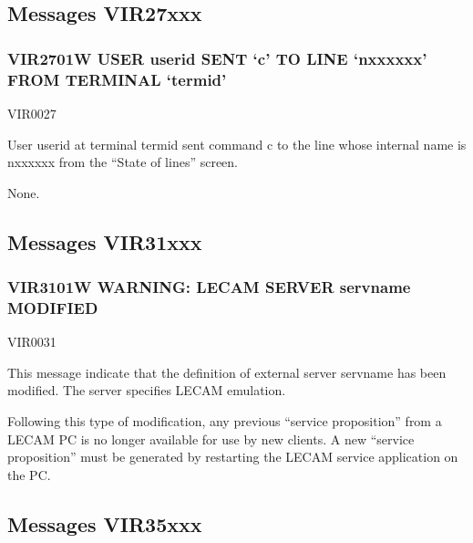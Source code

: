 \documentclass[letterpaper,10pt,english]{sphinxmanual}
\begin{document}
\subsection{Messages VIR27xxx}
\label{\detokenize{messages:messages-vir27xxx}}

\subsubsection{VIR2701W USER userid SENT ‘c’ TO LINE ‘n\sphinxhyphen{}xxxxxx’ FROM TERMINAL ‘termid’}
\label{\detokenize{messages:vir2701w-user-userid-sent-c-to-line-n-xxxxxx-from-terminal-termid}}\begin{description}
\sphinxAtStartPar
VIR0027

\sphinxAtStartPar
User userid at terminal termid sent command c to the line whose internal name is n\sphinxhyphen{}xxxxxx from the “State of lines” screen.

\sphinxAtStartPar
None.

\end{description}


\subsection{Messages VIR31xxx}
\label{\detokenize{messages:messages-vir31xxx}}

\subsubsection{VIR3101W WARNING: LECAM SERVER servname MODIFIED}
\label{\detokenize{messages:vir3101w-warning-lecam-server-servname-modified}}\begin{description}
\sphinxAtStartPar
VIR0031

\sphinxAtStartPar
This message indicate that the definition of external server servname has been modified. The server specifies LECAM emulation.

\sphinxAtStartPar
Following this type of modification, any previous “service proposition” from a LECAM PC is no longer available for use by new clients. A new “service proposition” must be generated by restarting the LECAM service application on the PC.

\end{description}


\subsection{Messages VIR35xxx}
\label{\detokenize{messages:messages-vir35xxx}}
\end{document}
